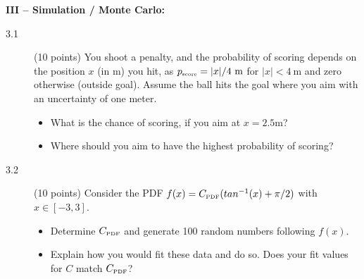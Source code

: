 \documentclass[11pt]{article}
\begin{document}

\newpage
\noindent
{\bf III -- Simulation / Monte Carlo:}
\vspace*{-1ex}
\begin{description}
%
  \item[3.1] (10 points)
    You shoot a penalty, and the probability of scoring depends on the position $x$ (in m) you hit, as
    $p_{\mbox{\tiny score}} = |x| / 4~\mbox{m}$ for $|x| < 4~\mbox{m}$ and zero otherwise (outside goal).
    Assume the ball hits the goal where you aim with an uncertainty of one meter.
  \vspace*{-1ex}
  \begin{itemize}
    \item What is the chance of scoring, if you aim at $x = 2.5$m?
    \item Where should you aim to have the highest probability of scoring?
  \end{itemize}
%
  \item[3.2] (10 points) Consider the PDF $f(x) = C_{\mbox{\tiny PDF}} (tan^{-1}(x)+\pi/2)$ with $x \in [-3,3]$.
  \vspace*{-1ex}
  \begin{itemize}
    \item Determine $C_{\mbox{\tiny PDF}}$ and generate 100 random numbers following $f(x)$.
    \item Explain how you would fit these data and do so. Does your fit values for $C$ match $C_{\mbox{\tiny PDF}}$?
  \end{itemize}
\end{description}


\end{document}
